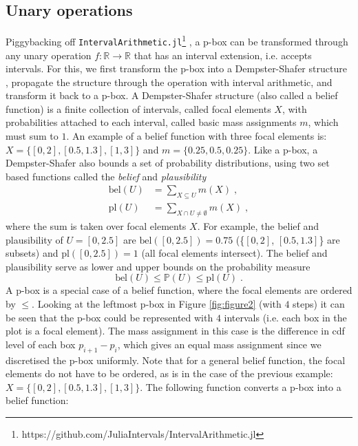 \documentclass{juliacon}
\begin{document}
\subsection{Unary operations}
Piggybacking off \texttt{IntervalArithmetic.jl}\footnote{https://github.com/JuliaIntervals/IntervalArithmetic.jl} \cite{david_p_sanders_2021_5519761}, a p-box can be transformed through any unary operation $f: \mathbb{R} \rightarrow \mathbb{R}$ that has  an interval extension, i.e. accepts intervals. For this, we first transform the p-box into a Dempster-Shafer structure \cite{dempster2008upper,shafer1976mathematical}, propagate the structure through the operation with interval arithmetic, and transform it back to a p-box. A Dempster-Shafer structure (also called a belief function) is a finite collection of intervals, called focal elements $X$, with probabilities attached to each interval, called basic mass assignments $m$, which must sum to $1$. An example of a belief function with three focal elements is: $X = \{[0, 2], [0.5, 1.3], [1, 3]\}$ and $m = \{0.25, 0.5, 0.25\}$. Like a p-box, a Dempster-Shafer also bounds a set of probability distributions, using two set based functions called the \textit{belief} and \textit{plausibility}
\begin{align*}
  \text{bel}(U) &= \sum_{X \subseteq U} m(X) \;,\\ 
  \text{pl}(U) &= \sum_{X \cap U \neq \emptyset} m(X) \;,
\end{align*}
where the sum is taken over focal elements $X$. For example, the belief and plausibility of $U = [0,2.5]$ are $\text{bel}([0,2.5]) = 0.75$ (\{$[0, 2]$, $[0.5, 1.3]$\} are subsets) and $\text{pl}([0, 2.5]) = 1$ (all focal elements intersect). The belief and plausibility serve as lower and upper bounds on the probability measure
\begin{equation*}
  \text{bel}(U) \leq \mathbb{P}(U) \leq \text{pl}(U) \;.
\end{equation*}
A p-box is a special case of a belief function, where the focal elements are ordered by $\leq$. Looking at the leftmost p-box in Figure \ref{fig:figure2} (with $4$ steps) it can be seen that the p-box could be represented with $4$ intervals (i.e. each box in the plot is a focal element). The mass assignment
in this case is the difference in cdf level of each box $p_{i+1} - p_{i}$, which gives an equal mass assignment since we discretised the p-box uniformly. Note that for a general belief function, the focal elements do not have to be ordered, as is in the case of the previous example: $X = \{[0, 2], [0.5, 1.3], [1, 3]\}$. The following function converts a p-box into a belief function:
\end{document}

